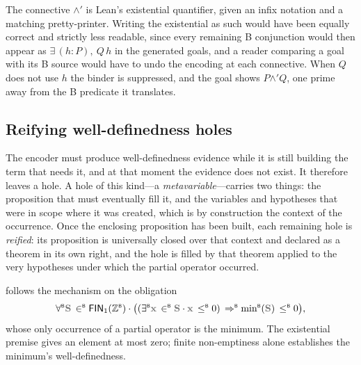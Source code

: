 The connective \(\land'\) is Lean's existential quantifier, given an infix notation and a matching
pretty-printer.
Writing the existential as such would have been equally correct and strictly less readable,
since every remaining B conjunction would then appear as \(\exists\,(h : P),\ Q\,h\) in the
generated goals, and a reader comparing a goal with its B source would have to undo the
encoding at each connective.
When \(Q\) does not use \(h\) the binder is suppressed, and the goal shows
\(P \mathbin{\land'} Q\), one prime away from the B predicate it translates.

\subsection{Reifying well-definedness holes}
\label{subsec:barrel-reification}

The encoder must produce well-definedness evidence while it is still building the term
that needs it, and at that moment the evidence does not exist.
It therefore leaves a hole.
A hole of this kind---a \emph{metavariable}---carries two things: the proposition that must
eventually fill it, and the variables and hypotheses that were in scope where it was
created, which is by construction the context of the occurrence.
Once the enclosing proposition has been built, each remaining hole is \emph{reified}: its
proposition is universally closed over that context and declared as a theorem in its own
right, and the hole is filled by that theorem applied to the very hypotheses under which
the partial operator occurred.

 follows the mechanism on the obligation
\[
  \forallB \var{S} \inB \mathsf{FIN}_1(\ZintB) \cdot
    \bigl( (\existsB \var{x} \inB \var{S} \cdot \var{x} \leB 0) \impB \minB(\var{S}) \leB 0 \bigr),
\]
whose only occurrence of a partial operator is the minimum.
The existential premise gives an element at most zero; finite non-emptiness alone
establishes the minimum's well-definedness.

